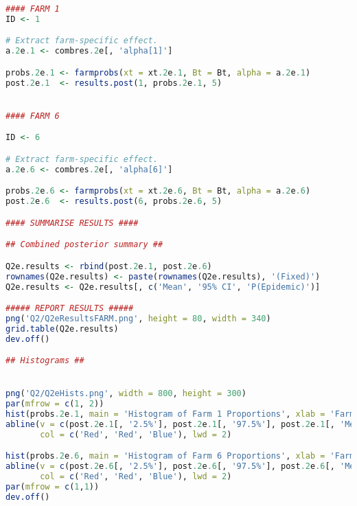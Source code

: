 \documentclass[11pt]{article}
\begin{document}
\begin{lstlisting}[language=R]
#### FARM 1
ID <- 1

# Extract farm-specific effect. 
a.2e.1 <- combres.2e[, 'alpha[1]']

probs.2e.1 <- farmprobs(xt = xt.2e.1, Bt = Bt, alpha = a.2e.1)
post.2e.1  <- results.post(1, probs.2e.1, 5)


#### FARM 6

ID <- 6

# Extract farm-specific effect. 
a.2e.6 <- combres.2e[, 'alpha[6]']

probs.2e.6 <- farmprobs(xt = xt.2e.6, Bt = Bt, alpha = a.2e.6)
post.2e.6  <- results.post(6, probs.2e.6, 5)

#### SUMMARISE RESULTS ####

## Combined posterior summary ##

Q2e.results <- rbind(post.2e.1, post.2e.6)
rownames(Q2e.results) <- paste(rownames(Q2e.results), '(Fixed)') 
Q2e.results <- Q2e.results[, c('Mean', '95% CI', 'P(Epidemic)')]

##### REPORT RESULTS #####
png('Q2/Q2eResultsFARM.png', height = 80, width = 340)
grid.table(Q2e.results)
dev.off()

## Histograms ##


png('Q2/Q2eHists.png', width = 800, height = 300)
par(mfrow = c(1, 2))
hist(probs.2e.1, main = 'Histogram of Farm 1 Proportions', xlab = 'Farm 1 Proportion')
abline(v = c(post.2e.1[, '2.5%'], post.2e.1[, '97.5%'], post.2e.1[, 'Mean']), 
       col = c('Red', 'Red', 'Blue'), lwd = 2)

hist(probs.2e.6, main = 'Histogram of Farm 6 Proportions', xlab = 'Farm 6 Proportion')
abline(v = c(post.2e.6[, '2.5%'], post.2e.6[, '97.5%'], post.2e.6[, 'Mean']), 
       col = c('Red', 'Red', 'Blue'), lwd = 2)
par(mfrow = c(1,1))
dev.off()

\end{lstlisting}


\newpage
\end{document}
